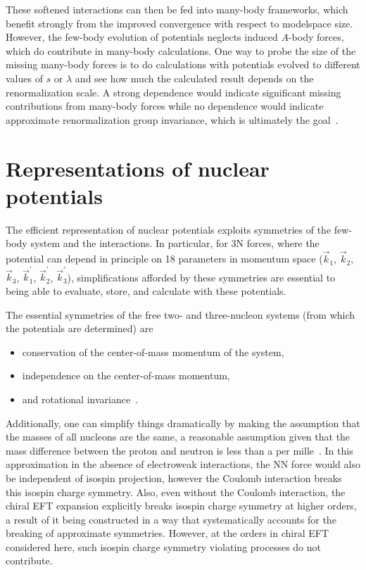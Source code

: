 These softened interactions can then be fed into many-body frameworks,
which benefit strongly from the improved convergence with respect to modelspace size.
However, the few-body evolution of potentials neglects induced $A$-body forces,
which do contribute in many-body calculations.
One way to probe the size of the missing many-body forces is to do calculations
with potentials evolved to different values of $s$ or $\lambda$
and see how much the calculated result depends on the renormalization scale.
A strong dependence would indicate significant missing contributions from many-body forces
while no dependence would indicate approximate renormalization group invariance,
which is ultimately the goal~\cite{Bogn09vlowk}.

\section{Representations of nuclear potentials}

The efficient representation of nuclear potentials exploits symmetries of the few-body system and the interactions.
In particular, for 3N forces,
where the potential can depend in principle on 18 parameters in momentum space
($\vec{k}_1$, $\vec{k}_2$, $\vec{k}_3$, $\vec{k}_{1}^{\prime}$, $\vec{k}_{2}^{\prime}$, $\vec{k}_{3}^{\prime}$),
simplifications afforded by these symmetries are essential
to being able to evaluate, store, and calculate with these potentials.

The essential symmetries of the free two- and three-nucleon systems
(from which the potentials are determined)
are
\begin{itemize}
  \item conservation of the center-of-mass momentum of the system,
  \item independence on the center-of-mass momentum,
  \item and rotational invariance~\cite{Hebe20habi}.
\end{itemize}
Additionally, one can simplify things dramatically by making the assumption that the masses of all nucleons are the same,
a reasonable assumption given that the mass difference between the proton and neutron is less than a per mille~\cite{Hebe20habi}.
In this approximation in the absence of electroweak interactions,
the NN force would also be independent of isospin projection,
however the Coulomb interaction breaks this isospin charge symmetry.
Also, even without the Coulomb interaction,
the chiral EFT expansion explicitly breaks isospin charge symmetry at higher orders,
a result of it being constructed in a way
that systematically accounts for the breaking of approximate symmetries.
However, at the orders in chiral EFT considered here,
such isospin charge symmetry violating processes do not contribute.


